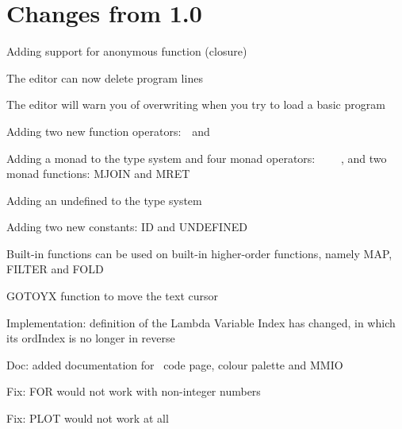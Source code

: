 \section{Changes from 1.0}

\begin{itemlist}
\item Adding support for anonymous function (closure)
\item The editor can now delete program lines
\item The editor will warn you of overwriting when you try to load a basic program
\item Adding two new function operators: \basicapply\ \,and\ \,\basiccompo
\item Adding a monad to the type system and four monad operators: \basicmbind\ \basicmseq\ \basicmjoin\ \basicmret\ , and two monad functions: MJOIN and MRET
\item Adding an undefined to the type system
\item Adding two new constants: ID and UNDEFINED
\item Built-in functions can be used on built-in higher-order functions, namely MAP, FILTER and FOLD
\item GOTOYX function to move the text cursor
\item Implementation: definition of the Lambda Variable Index has changed, in which its ordIndex is no longer in reverse
\item Doc: added documentation for \thismachine\ code page, colour palette and MMIO
\item Fix: FOR would not work with non-integer numbers
\item Fix: PLOT would not work at all
\end{itemlist}

